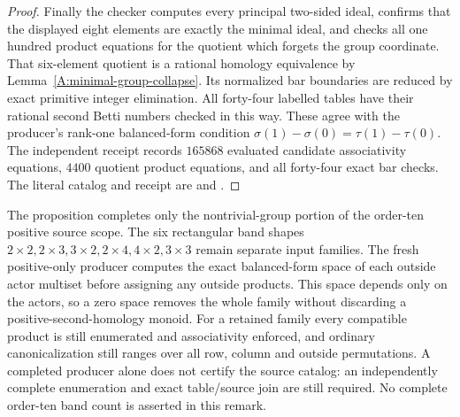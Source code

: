 \begin{proof}
Finally the checker computes every principal two-sided
ideal, confirms that the displayed eight elements are
exactly the minimal ideal, and checks all one hundred
product equations for the quotient which forgets the group
coordinate. That six-element quotient is a rational
homology equivalence by Lemma~\ref{A:minimal-group-collapse}.
Its normalized bar boundaries are reduced by exact primitive
integer elimination. All forty-four labelled tables have
their rational second Betti numbers checked in this way.
These agree with the producer's rank-one balanced-form
condition $\sigma(1)-\sigma(0)=\tau(1)-\tau(0)$.
The independent receipt records $165868$ evaluated candidate
associativity equations, $4400$ quotient product equations,
and all forty-four exact bar checks. The literal catalog and
receipt are
 and
.
\end{proof}

\begin{remark*}
The proposition completes only the nontrivial-group portion
of the order-ten positive source scope. The six rectangular
band shapes
$2\times2,2\times3,3\times2,2\times4,4\times2,3\times3$
remain separate input families. The fresh positive-only
producer  computes
the exact balanced-form space of each outside actor multiset
before assigning any outside products. This space depends
only on the actors, so a zero space removes the whole family
without discarding a positive-second-homology monoid.
For a retained family every compatible product is still
enumerated and associativity enforced, and ordinary
canonicalization still ranges over all row, column and
outside permutations. A completed producer alone does not
certify the source catalog: an independently complete
enumeration and exact table/source join are still required.
No complete order-ten band count is asserted in this remark.
\end{remark*}
